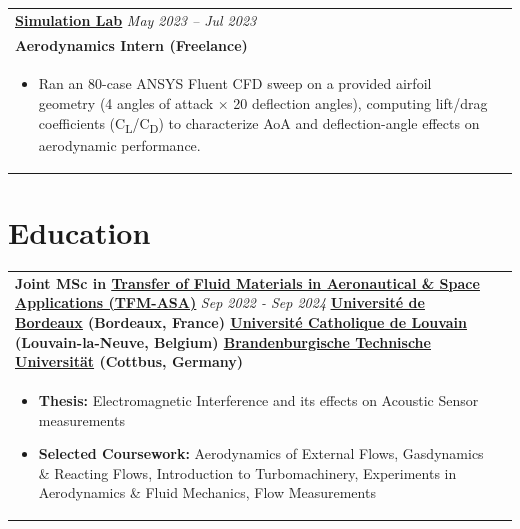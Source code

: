 \documentclass[a4paper,8pt]{article}
\newcommand{\ulhref}[2]{%
  {\hypersetup{urlcolor=.}\textcolor{.}{\href{#1}{\uline{#2}}}}%
}
\begin{document}
\begin{tabularx}{\linewidth}{ @{}l r@{} }
\textbf{\ulhref{https://www.simulationlab.in/}{Simulation Lab}} \hfill \color[HTML]{371e77} \textit{May 2023 -- Jul 2023}\\[1pt]
\color[HTML]{371e77}\textbf{Aerodynamics Intern (Freelance)}\ \hfill \color[HTML]{4B28A4}  \\[1pt]
\begin{minipage}[t]{\linewidth}
    \begin{itemize}[nosep,after=\strut, leftmargin=*, itemsep=1pt]
        \item Ran an 80-case ANSYS Fluent CFD sweep on a provided airfoil geometry (4 angles of attack \(\times\) 20 deflection angles), computing lift/drag coefficients (C\textsubscript{L}/C\textsubscript{D}) to characterize AoA and deflection-angle effects on aerodynamic performance.
    \end{itemize}
\end{minipage}
\end{tabularx}

\section{Education}
\begin{tabularx}{\linewidth}{@{}X r@{}}
\textbf{Joint MSc in \ulhref{https://tfmasa.eu/}{Transfer of Fluid Materials in Aeronautical \& Space Applications (TFM-ASA)}} \hfill \color[HTML]{371e77} \textit{Sep 2022 - Sep 2024}
\newline
\color[HTML]{371e77}\textbf{\ulhref{https://www.u-bordeaux.fr/}{Université de Bordeaux} (Bordeaux, France) \ulhref{https://www.uclouvain.be/fr}{Université Catholique de Louvain} (Louvain-la-Neuve, Belgium) \ulhref{https://www.b-tu.de/en/}{Brandenburgische Technische Universität} (Cottbus, Germany)}\ \hfill \color[HTML]{4B28A4}  \\[1pt]
\begin{minipage}[t]{\linewidth}
    \begin{itemize}[nosep,after=\strut, leftmargin=*, itemsep=1pt]
        \item \textbf{Thesis:} Electromagnetic Interference and its effects on Acoustic Sensor measurements
        \item \textbf{Selected Coursework:} Aerodynamics of External Flows, Gasdynamics \& Reacting Flows, Introduction to Turbomachinery, Experiments in Aerodynamics \& Fluid Mechanics, Flow Measurements
    \end{itemize}
\end{minipage}
\end{tabularx}
\end{document}
